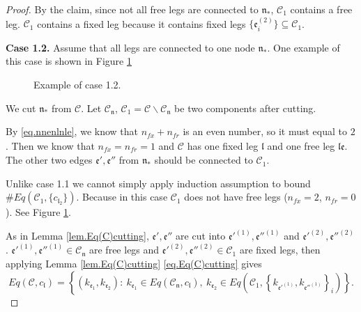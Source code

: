 \begin{proof}
    By the claim, since not all free legs are connected to $\mathfrak{n}_*$, $\mathcal{C}_1$ contains a free leg. $\mathcal{C}_1$ contains a fixed leg because it contains fixed legs $\{\mathfrak{e}_{i}^{(2)}\}\subseteq \mathcal{C}_1$.
    
    \textbf{Case 1.2.} Assume that all legs are connected to one node $\mathfrak{n}_*$. One example of this case is shown in Figure \ref{fig.examplecase1.2}
    
    \begin{figure}[H]
     \centering
     \caption{Example of case 1.2.}
     \label{fig.examplecase1.2}
    \end{figure}
    
    We cut $\mathfrak{n}_*$ from $\mathcal{C}$. Let $\mathcal{C}_{\mathfrak{n}}$, $\mathcal{C}_1=\mathcal{C}\backslash \mathcal{C}_{\mathfrak{n}}$ be two components after cutting.
    
    By \eqref{eq.nnenlnle}, we know that $n_{\textit{fx}}+n_{\textit{fr}}$ is an even number, so it must equal to $2$. Then we know that $n_{\textit{fx}}=n_{\textit{fr}}=1$ and $\mathcal{C}$ has one fixed leg $\mathfrak{l}$ and one free leg $\mathfrak{l}\mathfrak{e}$. The other two edges $\mathfrak{e}', \mathfrak{e}''$ from $\mathfrak{n}_*$ should be connected to $\mathcal{C}_1$.
    
    Unlike case 1.1 we cannot simply apply induction assumption to bound $\# Eq(\mathcal{C}_1, \{c_{\mathfrak{l}_2}\})$. Because in this case $\mathcal{C}_1$ does not have free legs ($n_{\textit{fx}}=2$, $n_{\textit{fr}}=0$). See Figure \ref{fig.examplecase1.2}.
    
    As in Lemma \ref{lem.Eq(C)cutting}, $\mathfrak{e}', \mathfrak{e}''$ are cut into $\mathfrak{e}'^{(1)}, \mathfrak{e}''^{(1)}$
    and $\mathfrak{e}'^{(2)}, \mathfrak{e}''^{(2)}$. $\mathfrak{e}'^{(1)}, \mathfrak{e}''^{(1)}\in \mathcal{C}_{\mathfrak{n}}$ are free legs and $\mathfrak{e}'^{(2)}, \mathfrak{e}''^{(2)}\in \mathcal{C}_1$ are fixed legs, then applying Lemma \ref{lem.Eq(C)cutting} \eqref{eq.Eq(C)cutting} gives
    \begin{equation}
     Eq(\mathcal{C},c_{\mathfrak{l}})=\left\{(k_{\mathfrak{e}_1},k_{\mathfrak{e}_{2}}):\ k_{\mathfrak{e}_1}\in Eq(\mathcal{C}_{\mathfrak{n}},c_{\mathfrak{l}}),\  k_{\mathfrak{e}_{2}}\in Eq\left(\mathcal{C}_1, \left\{k_{\mathfrak{e}'^{(1)}}, k_{\mathfrak{e}''^{(1)}}\right\}_{i}\right)\right\}.
    \end{equation}
    

\end{proof}
